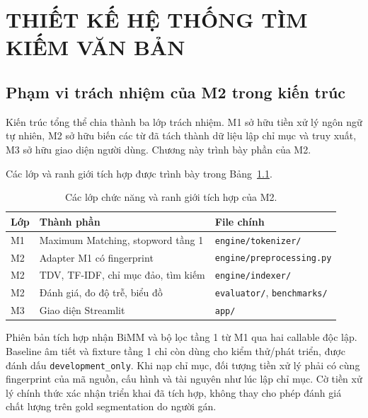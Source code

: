 \chapter{THIẾT KẾ HỆ THỐNG TÌM KIẾM VĂN BẢN}

\section{Phạm vi trách nhiệm của M2 trong kiến trúc}

Kiến trúc tổng thể chia thành ba lớp trách nhiệm. M1 sở hữu tiền xử lý ngôn ngữ
tự nhiên, M2 sở hữu biến các từ đã tách thành dữ liệu lập chỉ mục và truy xuất,
M3 sở hữu giao diện người dùng. Chương này trình bày phần của M2.

Các lớp và ranh giới tích hợp được trình bày trong Bảng~\ref{tab:kien-truc-m2}.
\begin{table}[ht]
\centering
\begin{tabular}{|p{}|p{}|p{}|}
\hline
Lớp & Thành phần & File chính \\
\hline
M1 & Maximum Matching, stopword tầng 1 & \texttt{engine/tokenizer/} \\
M2 & Adapter M1 có fingerprint & \texttt{engine/preprocessing.py} \\
M2 & TDV, TF-IDF, chỉ mục đảo, tìm kiếm & \texttt{engine/indexer/} \\
M2 & Đánh giá, đo độ trễ, biểu đồ & \texttt{evaluator/}, \texttt{benchmarks/} \\
M3 & Giao diện Streamlit & \texttt{app/} \\
\hline
\end{tabular}
\caption{Các lớp chức năng và ranh giới tích hợp của M2.}
\label{tab:kien-truc-m2}
\end{table}

Phiên bản tích hợp nhận BiMM và bộ lọc tầng 1 từ M1 qua hai callable độc lập.
Baseline âm tiết và fixture tầng 1 chỉ còn dùng cho kiểm thử/phát triển,
được đánh dấu \texttt{development\_only}. Khi nạp chỉ mục,
đối tượng tiền xử lý phải có cùng fingerprint của mã nguồn, cấu hình và tài
nguyên như lúc lập chỉ mục. Cờ tiền xử lý chính thức xác nhận triển khai đã tích
hợp, không thay cho phép đánh giá chất lượng trên gold segmentation do người gán.



